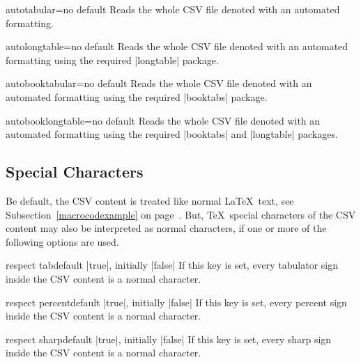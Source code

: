 \documentclass[a4paper,11pt]{ltxdoc}
\begin{document}
\begin{docCsvKey}{autotabular}{=}{no default}
  Reads the whole CSV file denoted  with an automated formatting.
\end{docCsvKey}


\begin{docCsvKey}{autolongtable}{=}{no default}
  Reads the whole CSV file denoted  with an automated formatting
  using the required |longtable| package.
\end{docCsvKey}


\begin{docCsvKey}{autobooktabular}{=}{no default}
  Reads the whole CSV file denoted  with an automated formatting
  using the required |booktabs| package.
\end{docCsvKey}


\begin{docCsvKey}{autobooklongtable}{=}{no default}
  Reads the whole CSV file denoted  with an automated formatting
  using the required |booktabs| and |longtable| packages.
\end{docCsvKey}


\clearpage
\subsection{Special Characters}\label{subsec:specchar}
Be default, the CSV content is treated like normal \LaTeX\ text, see
Subsection~\ref{macrocodexample} on page~\pageref{macrocodexample}.
But, \TeX\ special characters of the CSV content may also be interpreted
as normal characters, if one or more of the following options are used.

\begin{docCsvKey}{respect tab}{}{default |true|, initially |false|}
  If this key is set, every
  tabulator sign
  inside the CSV content is a normal character.
\end{docCsvKey}

\begin{docCsvKey}{respect percent}{}{default |true|, initially |false|}
  If this key is set, every
  percent sign \verbbox{\%}
  inside the CSV content is a normal character.
\end{docCsvKey}

\begin{docCsvKey}{respect sharp}{}{default |true|, initially |false|}
  If this key is set, every
  sharp sign \verbbox{\#}
  inside the CSV content is a normal character.
\end{docCsvKey}
\end{document}
